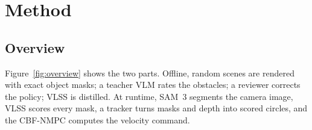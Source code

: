 \documentclass[10pt,a4paper]{article}
\begin{document}
\section{Method}\label{sec:method}

\subsection{Overview}
Figure~\ref{fig:overview} shows the two parts. Offline, random scenes are rendered with exact object masks; a teacher VLM rates the
obstacles; a reviewer corrects the policy; VLSS is distilled. At runtime, SAM~3 segments the camera image, VLSS scores every mask,
a tracker turns masks and depth into scored circles, and the CBF-NMPC computes the velocity command.
\end{document}
